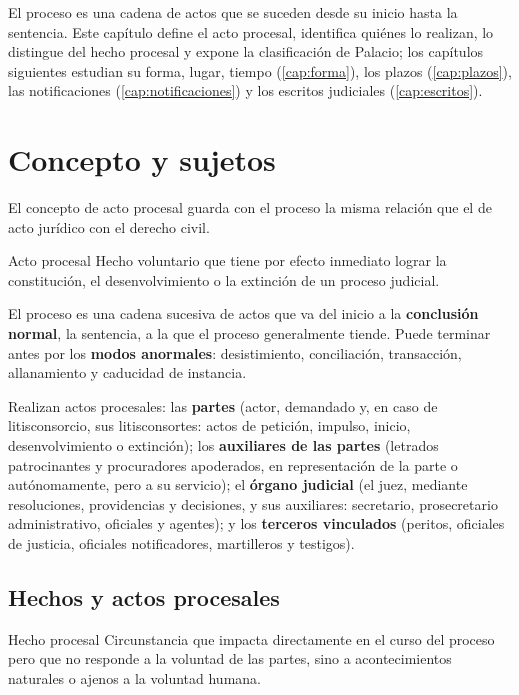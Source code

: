 \documentclass[12pt,oneside]{book}
\begin{document}
El proceso es una cadena de actos que se suceden desde su inicio hasta la sentencia. Este capítulo define el acto procesal, identifica quiénes lo realizan, lo distingue del hecho procesal y expone la clasificación de Palacio; los capítulos siguientes estudian su forma, lugar, tiempo (\ref{cap:forma}), los plazos (\ref{cap:plazos}), las notificaciones (\ref{cap:notificaciones}) y los escritos judiciales (\ref{cap:escritos}).

\section{Concepto y sujetos}

El concepto de acto procesal guarda con el proceso la misma relación que el de acto jurídico con el derecho civil.

\begin{definicion}{Acto procesal}
Hecho voluntario que tiene por efecto inmediato lograr la constitución, el desenvolvimiento o la extinción de un proceso judicial.
\end{definicion}

El proceso es una cadena sucesiva de actos que va del inicio a la \textbf{conclusión normal}, la sentencia, a la que el proceso generalmente tiende. Puede terminar antes por los \textbf{modos anormales}: desistimiento, conciliación, transacción, allanamiento y caducidad de instancia.

Realizan actos procesales: las \textbf{partes} (actor, demandado y, en caso de litisconsorcio, sus litisconsortes: actos de petición, impulso, inicio, desenvolvimiento o extinción); los \textbf{auxiliares de las partes} (letrados patrocinantes y procuradores apoderados, en representación de la parte o autónomamente, pero a su servicio); el \textbf{órgano judicial} (el juez, mediante resoluciones, providencias y decisiones, y sus auxiliares: secretario, prosecretario administrativo, oficiales y agentes); y los \textbf{terceros vinculados} (peritos, oficiales de justicia, oficiales notificadores, martilleros y testigos).

\subsection{Hechos y actos procesales}

\begin{definicion}{Hecho procesal}
Circunstancia que impacta directamente en el curso del proceso pero que no responde a la voluntad de las partes, sino a acontecimientos naturales o ajenos a la voluntad humana.
\end{definicion}
\end{document}
